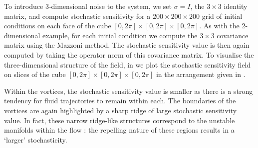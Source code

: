 To introduce 3-dimensional noise to the system, we set \(\sigma = I\), the \(3 \times 3\) identity matrix, and compute stochastic sensitivity for a \(200\times 200\times 200\) grid of initial conditions on each face of the cube \([0,2\pi] \times [0,2\pi] \times [0,2\pi]\).
As with the 2-dimensional example, for each initial condition we compute the \(3 \times 3\) covariance matrix using the Mazzoni method.
The stochastic sensitivity value is then again computed by taking the operator norm of this covariance matrix.
To visualise the three-dimensional structure of the field, in  we plot the stochastic sensitivity field on slices of the cube \([0,2\pi] \times [0,2\pi] \times [0,2\pi]\) in the arrangement given in .

Within the vortices, the stochastic sensitivity value is smaller as there is a strong tendency for fluid trajectories to remain within each.
The boundaries of the vortices are again highlighted by a sharp ridge of large stochastic sensitivity value.
In fact, these narrow ridge-like structures correspond to the unstable manifolds within the flow \citep{DombreEtAl_1986_ChaoticStreamlinesABC}: the repelling nature of these regions results in a `larger' stochasticity.




